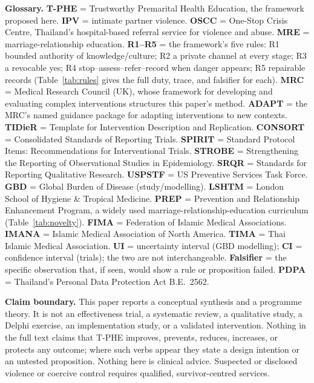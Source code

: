 \documentclass[11pt]{article}
\newcommand{\tphe}{T\mbox{-}PHE}
\begin{document}
\begin{center}
\begin{minipage}{0.94\textwidth}
\footnotesize
\noindent\textbf{Glossary.} \textbf{T-PHE} = Trustworthy Premarital Health Education, the framework proposed here. \textbf{IPV} = intimate partner violence. \textbf{OSCC} = One-Stop Crisis Centre, Thailand's hospital-based referral service for violence and abuse. \textbf{MRE} = marriage-relationship education. \textbf{R1--R5} = the framework's five rules: R1 bounded authority of knowledge/culture; R2 a private channel at every stage; R3 a revocable yes; R4 stop--assess--refer--record when danger appears; R5 repairable records (Table~\ref{tab:rules} gives the full duty, trace, and falsifier for each). \textbf{MRC} = Medical Research Council (UK), whose framework for developing and evaluating complex interventions structures this paper's method. \textbf{ADAPT} = the MRC's named guidance package for adapting interventions to new contexts. \textbf{TIDieR} = Template for Intervention Description and Replication. \textbf{CONSORT} = Consolidated Standards of Reporting Trials. \textbf{SPIRIT} = Standard Protocol Items: Recommendations for Interventional Trials. \textbf{STROBE} = Strengthening the Reporting of Observational Studies in Epidemiology. \textbf{SRQR} = Standards for Reporting Qualitative Research. \textbf{USPSTF} = US Preventive Services Task Force. \textbf{GBD} = Global Burden of Disease (study/modelling). \textbf{LSHTM} = London School of Hygiene \& Tropical Medicine. \textbf{PREP} = Prevention and Relationship Enhancement Program, a widely used marriage-relationship-education curriculum (Table~\ref{tab:novelty}). \textbf{FIMA} = Federation of Islamic Medical Associations. \textbf{IMANA} = Islamic Medical Association of North America. \textbf{TIMA} = Thai Islamic Medical Association. \textbf{UI} = uncertainty interval (GBD modelling); \textbf{CI} = confidence interval (trials); the two are not interchangeable. \textbf{Falsifier} = the specific observation that, if seen, would show a rule or proposition failed. \textbf{PDPA} = Thailand's Personal Data Protection Act B.E.~2562.
\end{minipage}
\end{center}
\vspace{3mm}
\begin{center}
\begin{minipage}{0.94\textwidth}
\footnotesize
\noindent\textbf{Claim boundary.} This paper reports a conceptual synthesis and a programme theory. It is not an effectiveness trial, a systematic review, a qualitative study, a Delphi exercise, an implementation study, or a validated intervention. Nothing in the full text claims that \tphe{} improves, prevents, reduces, increases, or protects any outcome; where such verbs appear they state a design intention or an untested proposition. Nothing here is clinical advice. Suspected or disclosed violence or coercive control requires qualified, survivor-centred services.
\end{minipage}
\end{center}
\vspace{4mm}
\end{document}
